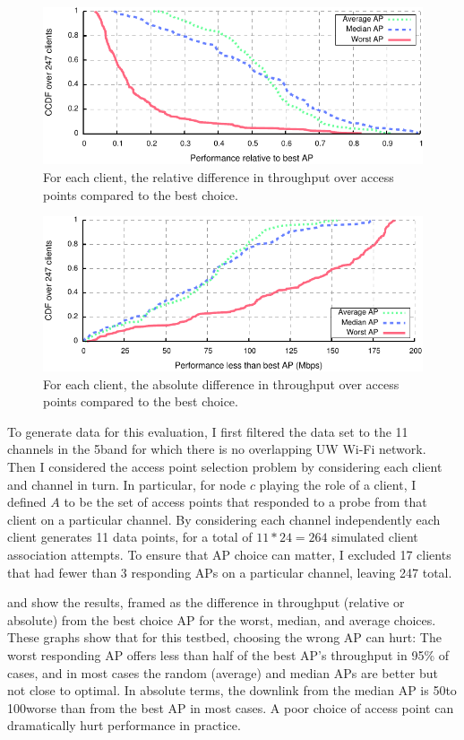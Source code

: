 \begin{figure}[t]
	\centering
	\includegraphics[width=\textwidth]{figures/applications/ap_sel_rel_diff.pdf}
	\caption{\label{fig:ap_sel_rel_diff}For each client, the relative difference in throughput over access points compared to the best choice.}
\end{figure}
\begin{figure}[!ht]
	\centering
	\includegraphics[width=\textwidth]{figures/applications/ap_sel_tpt_diff.pdf}
	\caption{\label{fig:ap_sel_tpt_diff}For each client, the absolute difference in throughput over access points compared to the best choice.}
\end{figure}

To generate data for this evaluation, I first filtered the data set to the 11 channels in the 5\GHz band for which there is no overlapping UW Wi-Fi network. Then I considered the access point selection problem by considering each client and channel in turn. In particular, for node $c$ playing the role of a client, I defined $A$ to be the set of access points that responded to a probe from that client on a particular channel. By considering each channel independently each client generates 11 data points, for a total of $11*24=264$ simulated client association attempts. To ensure that AP choice can matter, I excluded 17 clients that had fewer than 3 responding APs on a particular channel, leaving 247 total.

 and  show the results, framed as the difference in throughput (relative or absolute) from the best choice AP for the worst, median, and average choices. These graphs show that for this testbed, choosing the wrong AP can hurt: The worst responding AP offers less than half of the best AP's throughput in 95\% of cases, and in most cases the random (average) and median APs are better but not close to optimal. In absolute terms, the downlink from the median AP is 50\Mbps to 100\Mbps worse than from the best AP in most cases. A poor choice of access point can dramatically hurt performance in practice.

